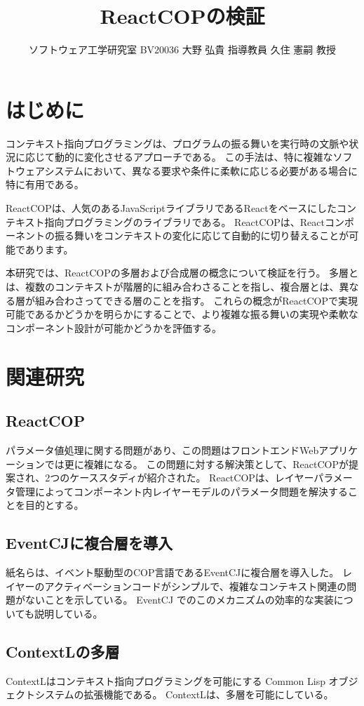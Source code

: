 \documentclass[twocolumn]{jarticle}
\title{
  \LARGE\bf
  ReactCOPの検証 \\[1ex]}
\author{ソフトウェア工学研究室 \quad
        BV20036 大野 弘貴 \quad
        指導教員 久住 憲嗣 教授}
\date{}
\begin{document}
\maketitle
\thispagestyle{empty}

\section{はじめに}

コンテキスト指向プログラミングは、プログラムの振る舞いを実行時の文脈や状況に応じて動的に変化させるアプローチである。
この手法は、特に複雑なソフトウェアシステムにおいて、異なる要求や条件に柔軟に応じる必要がある場合に特に有用である。

ReactCOPは、人気のあるJavaScriptライブラリであるReactをベースにしたコンテキスト指向プログラミングのライブラリである。
ReactCOPは、Reactコンポーネントの振る舞いをコンテキストの変化に応じて自動的に切り替えることが可能であります。

本研究では、ReactCOPの多層および合成層の概念について検証を行う。
多層とは、複数のコンテキストが階層的に組み合わさることを指し、複合層とは、異なる層が組み合わさってできる層のことを指す。
これらの概念がReactCOPで実現可能であるかどうかを明らかにすることで、より複雑な振る舞いの実現や柔軟なコンポーネント設計が可能かどうかを評価する。

\section{関連研究}
\subsection{ReactCOP}
パラメータ値処理に関する問題があり、この問題はフロントエンドWebアプリケーションでは更に複雑になる。
この問題に対する解決策として、ReactCOPが提案され、2つのケーススタディが紹介された。
ReactCOPは、レイヤーパラメータ管理によってコンポーネント内レイヤーモデルのパラメータ問題を解決することを目的とする。

\subsection{EventCJに複合層を導入}
紙名らは、イベント駆動型のCOP言語であるEventCJに複合層を導入した。
レイヤーのアクティベーションコードがシンプルで、複雑なコンテキスト関連の問題がないことを示している。
EventCJ でのこのメカニズムの効率的な実装についても説明している。

\subsection{ContextLの多層}
ContextLはコンテキスト指向プログラミングを可能にする Common Lisp オブジェクトシステムの拡張機能である。
ContextLは、多層を可能にしている。
\end{document}
